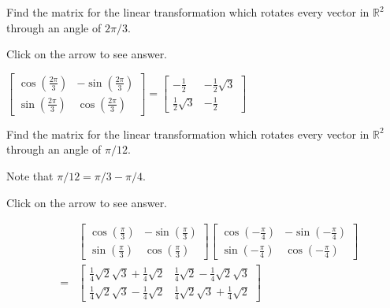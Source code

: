 \documentclass{ximera}
\begin{document}
\begin{problem}\label{prb:6.14} Find the matrix for the linear transformation which rotates every
vector in $\mathbb{R}^{2}$ through an angle of $2\pi /3.$

Click on the arrow to see answer.
\begin{expandable}
$\left[
\begin{array}{cc}
\cos \left( \frac{2\pi }{3}\right) & -\sin \left( \frac{2\pi }{3}\right) \\
\sin \left( \frac{2\pi }{3}\right) & \cos \left( \frac{2\pi }{3}\right)
\end{array}
\right] = \left[
\begin{array}{cc}
-\frac{1}{2} & -\frac{1}{2}\sqrt{3} \\
\frac{1}{2}\sqrt{3} & -\frac{1}{2}
\end{array}
\right] $
\end{expandable}
\end{problem}

\begin{problem}\label{prb:6.15} Find the matrix for the linear transformation which rotates every
vector in $\mathbb{R}^{2}$ through an angle of $\pi /12.$ 

\begin{hint}
Note that $\pi /12=\pi /3-\pi /4.$
\end{hint}

Click on the arrow to see answer.
\begin{expandable}
 \begin{eqnarray*}
&&\left[
\begin{array}{cc}
\cos \left( \frac{\pi }{3}\right)  & -\sin \left( \frac{\pi }{3}\right)  \\
\sin \left( \frac{\pi }{3}\right)  & \cos \left( \frac{\pi }{3}\right)
\end{array}
\right] \left[
\begin{array}{cc}
\cos \left( -\frac{\pi }{4}\right)  & -\sin \left( -\frac{\pi }{4}\right)
\\
\sin \left( -\frac{\pi }{4}\right)  & \cos \left( -\frac{\pi }{4}\right)
\end{array}
\right]  \\
&=&\left[
\begin{array}{cc}
\frac{1}{4}\sqrt{2}\sqrt{3}+\frac{1}{4}\sqrt{2} & \frac{1}{4}\sqrt{2}-\frac{1
}{4}\sqrt{2}\sqrt{3} \\
\frac{1}{4}\sqrt{2}\sqrt{3}-\frac{1}{4}\sqrt{2} & \frac{1}{4}\sqrt{2}\sqrt{3}
+\frac{1}{4}\sqrt{2}
\end{array}
\right]
\end{eqnarray*}
\end{expandable}
\end{problem}
\end{document}
